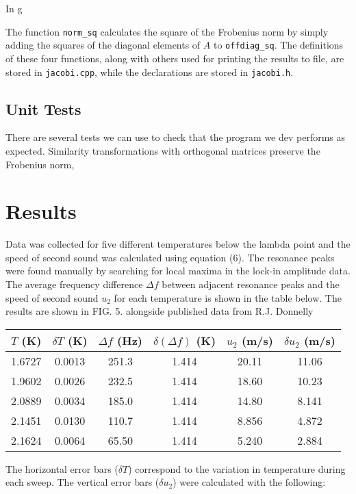 \documentclass[prb,aps,twocolumn,showpacs,10pt]{revtex4-1}
\begin{document}
In g

The function \texttt{norm\_sq} calculates the square of the Frobenius norm by simply adding the squares of the diagonal elements of $A$ to \texttt{offdiag\_sq}. The definitions of these four functions, along with others used for printing the results to file, are stored in \texttt{jacobi.cpp}, while the declarations are stored in \texttt{jacobi.h}. 

\subsection{Unit Tests}

There are several tests we can use to check that the program we dev performs as expected. 
Similarity transformations with orthogonal matrices preserve the Frobenius norm,

\section{Results}

Data was collected for five different temperatures below the lambda point and the speed of second sound was calculated using equation (6). The resonance peaks were found manually by searching for local maxima in the lock-in amplitude data. The average frequency difference $\Delta f$ between adjacent resonance peaks and the speed of second sound $u_2$ for each temperature is shown in the table below. The results are shown in FIG. 5. alongside published data from R.J. Donnelly \cite{donnelly.} 

\begin{center}
\begin{tabular}{|c|c|c|c|c|c|}
\hline
$T$ (K) & $\delta T$ (K) & $\Delta f$ (Hz) & $\delta(\Delta f)$ (K) & $u_2$ (m/s) & $\delta u_2$ (m/s)\\
\hline
\hline
1.6727&0.0013&251.3&1.414&20.11&11.06\\
\hline
1.9602&0.0026&232.5&1.414&18.60&10.23\\
\hline
2.0889&0.0034&185.0&1.414&14.80&8.141\\
\hline
2.1451&0.0130&110.7&1.414&8.856&4.872\\
\hline
2.1624&0.0064&65.50&1.414&5.240&2.884\\
\hline
\end{tabular}
\end{center}

The horizontal error bars ($\delta T$) correspond to the variation in temperature during each sweep. The vertical error bars ($\delta u_2$) were calculated with the following:
\end{document}
